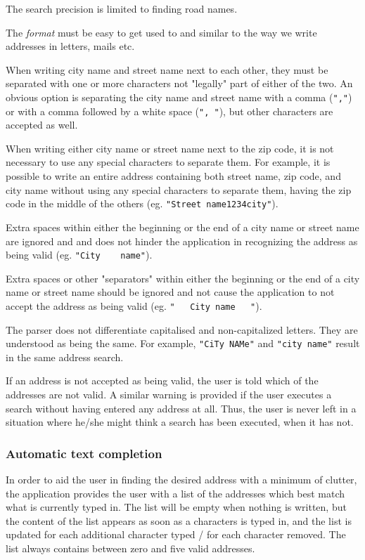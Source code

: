 The search precision is limited to finding road names.

The \textit{format} must be easy to get used to and similar to the way we write addresses in letters, mails etc.

When writing city name and street name next to each other, they must be separated with one or more characters not "legally" part of either of the two. An obvious option is separating the city name and street name with a comma (\texttt{","}) or with a comma followed by a white space (\texttt{", "}), but other characters are accepted as well.


When writing either city name or street name next to the zip code, it is not necessary to use any special characters to separate them. For example, it is possible to write     an entire address containing both street name, zip code, and city name without using any special characters to separate them, having the zip code in the middle of the others (eg. \texttt{"Street name1234city"}).

Extra spaces within either the beginning or the end of a city name or street name are ignored and and does not hinder the application in recognizing the address as being valid (eg. \texttt{"City\ \ \ \ name"}).

Extra spaces or other "separators" within either the beginning or the end of a city name or street name should be ignored and not cause the application to not accept the address as being valid (eg. \texttt{"\ \ \ City name\ \ \ "}).

The parser does not differentiate capitalised and non-capitalized letters. They are understood as being the same. For example, \texttt{"CiTy NAMe"} and \texttt{"city name"} result in the same address search.

If an address is not accepted as being valid, the user is told which of the addresses are not valid. A similar warning is provided if the user executes a search without having entered any address at all. Thus, the user is never left in a situation where he/she might think a search has been executed, when it has not.

\subsubsection{Automatic text completion}
In order to aid the user in finding the desired address with a minimum of clutter, the application provides the user with a list of the addresses which best match what is currently typed in. The list will be empty when nothing is written, but the content of the list appears as soon as a characters is typed in, and the list is updated for each additional character typed / for each character removed. The list always contains between zero and five valid addresses.

